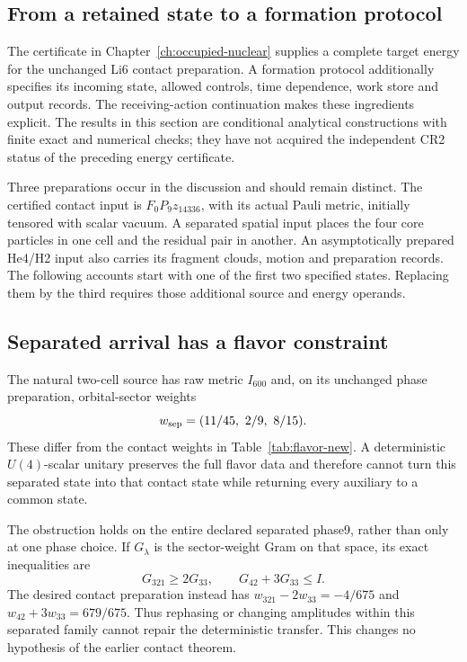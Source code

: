 \subsection{From a retained state to a formation protocol}
\label{sec:formation-nov}

The certificate in Chapter~\ref{ch:occupied-nuclear} supplies a complete
target energy for the unchanged Li6 contact preparation. A formation
protocol additionally specifies its incoming state, allowed controls,
time dependence, work store and output records. The receiving-action
continuation makes these ingredients explicit. The results in this section
are conditional analytical constructions with finite exact and numerical
checks; they have not acquired the independent CR2 status of the preceding
energy certificate.

Three preparations occur in the discussion and should remain distinct.
The certified contact input is $F_0P_9z_{14336}$, with its actual Pauli
metric, initially tensored with scalar vacuum. A separated spatial input
places the four core particles in one cell and the residual pair in another.
An asymptotically prepared He4/H2 input also carries its fragment clouds,
motion and preparation records. The following accounts start with one of
the first two specified states. Replacing them by the third requires those
additional source and energy operands.

\subsection{Separated arrival has a flavor constraint}
\label{sec:arrival-new}

The natural two-cell source has raw metric $I_{600}$ and, on its unchanged
phase preparation, orbital-sector weights
\begin{equation}
w_{\rm sep}=(11/45,\ 2/9,\ 8/15).
\end{equation}
These differ from the contact weights in Table~\ref{tab:flavor-new}.
A deterministic $U(4)$-scalar unitary preserves the full flavor data and
therefore cannot turn this separated state into that contact state while
returning every auxiliary to a common state.

The obstruction holds on the entire declared separated phase9, rather than
only at one phase choice. If $G_\lambda$ is the sector-weight Gram on that
space, its exact inequalities are
\begin{equation}
G_{321}\geq2G_{33},\qquad G_{42}+3G_{33}\leq I.
\end{equation}
The desired contact preparation instead has
$w_{321}-2w_{33}=-4/675$ and $w_{42}+3w_{33}=679/675$.
Thus rephasing or changing amplitudes within this separated family cannot
repair the deterministic transfer. This changes no hypothesis of the
earlier contact theorem.


